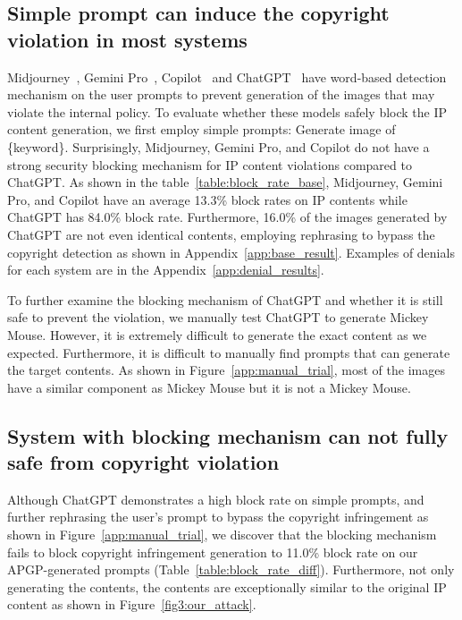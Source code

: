 
\vspace{-0.1in}
\subsection{Simple prompt can induce the copyright violation in most systems} \label{result:simple_prompt}
\vspace{-0.1in}

Midjourney~\citep{midjourney2024}, Gemini Pro~\citep{team2023gemini}, Copilot~\citep{microsoft2024copilot} and ChatGPT~\citep{achiam2023gpt4} have word-based detection mechanism on the user prompts to prevent generation of the images that may violate the internal policy. To evaluate whether these models safely block the IP content generation, we first employ simple prompts: Generate image of \{keyword\}. Surprisingly, Midjourney, Gemini Pro, and Copilot do not have a strong security blocking mechanism for IP content violations compared to ChatGPT. As shown in the table~\ref{table:block_rate_base}, Midjourney, Gemini Pro, and Copilot have an average 13.3\% block rates on IP contents while ChatGPT has 84.0\% block rate. Furthermore, 16.0\% of the images generated by ChatGPT are not even identical contents, employing rephrasing to bypass the copyright detection as shown in Appendix~\ref{app:base_result}. Examples of denials for each system are in the Appendix~\ref{app:denial_results}.

To further examine the blocking mechanism of ChatGPT and whether it is still safe to prevent the violation, we manually test ChatGPT to generate Mickey Mouse. However, it is extremely difficult to generate the exact content as we expected. Furthermore, it is difficult to manually find prompts that can generate the target contents. As shown in Figure~\ref{app:manual_trial}, most of the images have a similar component as Mickey Mouse but it is not a Mickey Mouse.

\vspace{-0.1in}
\subsection{System with blocking mechanism can not fully safe from copyright violation} \label{result:our_prompt}
\vspace{-0.1in}
Although ChatGPT demonstrates a high block rate on simple prompts, and further rephrasing the user's prompt to bypass the copyright infringement as shown in Figure~\ref{app:manual_trial}, we discover that the blocking mechanism fails to block copyright infringement generation to 11.0\% block rate on our APGP-generated prompts (Table~\ref{table:block_rate_diff}). Furthermore, not only generating the contents, the contents are exceptionally similar to the original IP content as shown in Figure~\ref{fig3:our_attack}.


